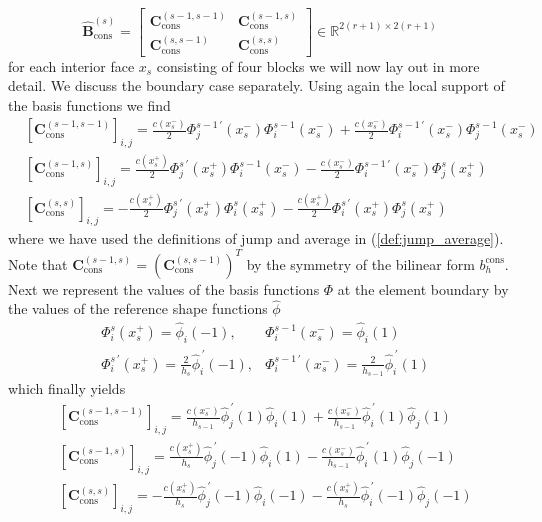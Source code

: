 \begin{equation*}
	\widehat{\textbf{B}}_{\text{cons}}^{(s)} =
	\begin{bmatrix}
		\textbf{C}_{\text{cons}}^{(s-1,s-1)} & \textbf{C}_{\text{cons}}^{(s-1,s)} \\
		\textbf{C}_{\text{cons}}^{(s,s-1)}   & \textbf{C}_{\text{cons}}^{(s,s)}
	\end{bmatrix}
	\in \mathbb{R}^{2(r+1) \times 2(r+1)}
\end{equation*}
for each interior face $x_s$ consisting of four blocks we will now lay out in more detail.
We discuss the boundary case separately.
Using again the local support of the basis functions we find
\begin{align*}
	 & [\textbf{C}_{\text{cons}}^{(s-1,s-1)}]_{i,j} = \frac{c(x_s^-)}{2} \Phi_j^{s-1\, \prime}(x_s^-) \Phi_i^{s-1}(x_s^-) + \frac{c(x_s^-)}{2} \Phi_i^{s-1\, \prime}(x_s^-) \Phi_j^{s-1}(x_s^-) \\
	 & [\textbf{C}_{\text{cons}}^{(s-1,s)}]_{i,j} = \frac{c(x_s^+)}{2} \Phi_j^{s\, \prime}(x_s^+) \Phi_i^{s-1}(x_s^-) - \frac{c(x_s^-)}{2} \Phi_i^{s-1\, \prime}(x_s^-) \Phi_j^{s}(x_s^+)       \\
	 & [\textbf{C}_{\text{cons}}^{(s,s)}]_{i,j} = -\frac{c(x_s^+)}{2} \Phi_j^{s\, \prime}(x_s^+) \Phi_i^{s}(x_s^+) - \frac{c(x_s^+)}{2} \Phi_i^{s\, \prime}(x_s^+) \Phi_j^{s}(x_s^+)
\end{align*}
where we have used the definitions of jump and average in (\ref{def:jump_average}).
Note that $ \textbf{C}_{\text{cons}}^{(s-1,s)} = (\textbf{C}_{\text{cons}}^{(s,s-1)})^T$ by the symmetry of the bilinear form $b_h^{\text{cons}}$.
Next we represent the values of the basis functions $ \Phi $ at the element boundary by the values of the reference
shape functions $\widehat{\phi}$
\begin{align}
	 & \Phi_i^s(x_s^+) = \widehat{\phi}_i(-1) ,                                                   & \Phi^{s-1}_i(x_s^-) = \widehat{\phi}_i(1) \label{eq:shape_fun_and_basis_fun_values_equality} \\
	 & \Phi_i^{s\, \prime }(x_s^+) = \frac{2}{h_{s}} \widehat{\phi}_i^{\,\prime}(-1),
	 & \Phi_i^{s-1\, \prime }(x_s^-) = \frac{2}{h_{s-1}} \widehat{\phi}_i^{\,\prime}(1) \nonumber
\end{align}
which finally yields
\begin{align*}
	 & [\textbf{C}_{\text{cons}}^{(s-1,s-1)}]_{i,j} = \frac{c(x_s^-)}{h_{s-1}} \widehat{\phi}_j^{\,\prime}(1) \widehat{\phi}_i(1) + \frac{c(x_s^-)}{h_{s-1}} \widehat{\phi}_i^{\,\prime} (1) \widehat{\phi}_j(1)  \\
	 & [\textbf{C}_{\text{cons}}^{(s-1,s)}]_{i,j} = \frac{c(x_s^+)}{h_{s}} \widehat{\phi}_j^{\,\prime} (-1) \widehat{\phi}_i (1) - \frac{c(x_s^-)}{h_{s-1}} \widehat{\phi}_i^{\,\prime} (1) \widehat{\phi}_j (-1) \\
	 & [\textbf{C}_{\text{cons}}^{(s,s)}]_{i,j} = -\frac{c(x_s^+)}{h_s} \widehat{\phi}_j^{\,\prime} (-1) \widehat{\phi}_i (-1) - \frac{c(x_s^+)}{h_s} \widehat{\phi}_i^{\,\prime} (-1) \widehat{\phi}_j (-1)
\end{align*}
